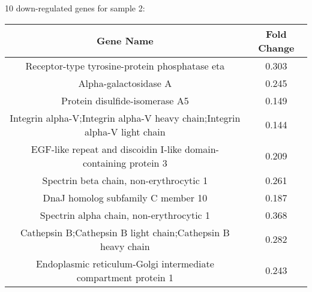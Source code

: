 \documentclass[10pt,a4paper]{article}
\begin{document}
10 down-regulated genes for sample 2:\\
\begin{tabular}{c | c}
	Gene Name & Fold Change\\
	\hline
	Receptor-type tyrosine-protein phosphatase eta & 0.303\\ 
	Alpha-galactosidase A & 0.245\\
	Protein disulfide-isomerase A5 & 0.149\\
	Integrin alpha-V;Integrin alpha-V heavy chain;Integrin alpha-V light chain & 0.144\\ 
	EGF-like repeat and discoidin I-like domain-containing protein 3 & 0.209\\ 
	Spectrin beta chain, non-erythrocytic 1 & 0.261\\
	DnaJ homolog subfamily C member 10 & 0.187\\
	Spectrin alpha chain, non-erythrocytic 1 & 0.368\\
	Cathepsin B;Cathepsin B light chain;Cathepsin B heavy chain & 0.282\\  
	Endoplasmic reticulum-Golgi intermediate compartment protein 1 & 0.243\\ 

\end{tabular}
\end{document}
